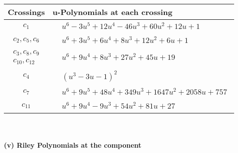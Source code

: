 \documentclass[1p]{elsarticle_modified}
\theoremstyle{definition}
\begin{document}
\begin{tabular}{m{50pt}|m{274pt}}
Crossings & \hspace{64pt}u-Polynomials at each crossing \\
\hline $$\begin{aligned}c_{1}\end{aligned}$$&$\begin{aligned}
&u^6-3 u^5+12 u^4-46 u^3+60 u^2+12 u+1
\end{aligned}$\\
\hline $$\begin{aligned}c_{2},c_{5},c_{6}\end{aligned}$$&$\begin{aligned}
&u^6+3 u^5+6 u^4+8 u^3+12 u^2+6 u+1
\end{aligned}$\\
\hline $$\begin{aligned}c_{3},c_{8},c_{9}\\c_{10},c_{12}\end{aligned}$$&$\begin{aligned}
&u^6+9 u^4+8 u^3+27 u^2+45 u+19
\end{aligned}$\\
\hline $$\begin{aligned}c_{4}\end{aligned}$$&$\begin{aligned}
&(u^3-3 u-1)^2
\end{aligned}$\\
\hline $$\begin{aligned}c_{7}\end{aligned}$$&$\begin{aligned}
&u^6+9 u^5+48 u^4+349 u^3+1647 u^2+2058 u+757
\end{aligned}$\\
\hline $$\begin{aligned}c_{11}\end{aligned}$$&$\begin{aligned}
&u^6+9 u^4-9 u^3+54 u^2+81 u+27
\end{aligned}$\\
\hline
\end{tabular}\\~\\
\newpage\renewcommand{\arraystretch}{1}
\flushleft \textbf{(v) Riley Polynomials at the component}\newline \\
\end{document}
